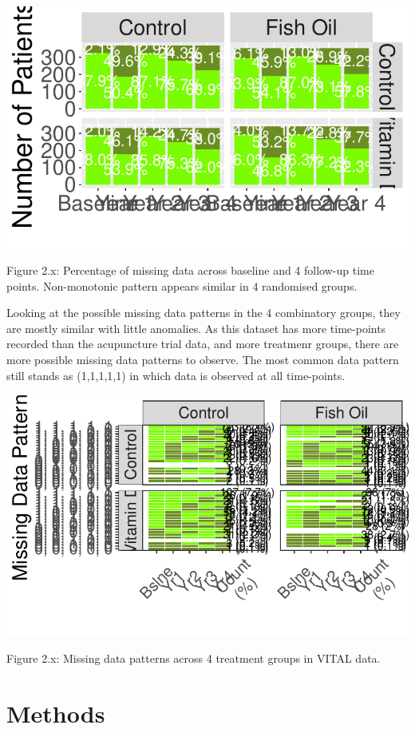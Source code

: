 \documentclass{article}
\newcommand{\pandocbounded}[1]{#1}
\begin{document}
\pandocbounded{\includegraphics[keepaspectratio]{Final_Report_files/figure-latex/unnamed-chunk-26-1.pdf}}

Figure 2.x: Percentage of missing data across baseline and 4 follow-up
time points. Non-monotonic pattern appears similar in 4 randomised
groups.

Looking at the possible missing data patterns in the 4 combinatory
groups, they are mostly similar with little anomalies. As this dataset
has more time-points recorded than the acupuncture trial data, and more
treatmenr groups, there are more possible missing data patterns to
observe. The most common data pattern still stands as (1,1,1,1,1) in
which data is observed at all time-points.

\pandocbounded{\includegraphics[keepaspectratio]{Final_Report_files/figure-latex/unnamed-chunk-27-1.pdf}}

Figure 2.x: Missing data patterns across 4 treatment groups in VITAL
data.

\newpage

\section{Methods}\label{methods}
\end{document}

